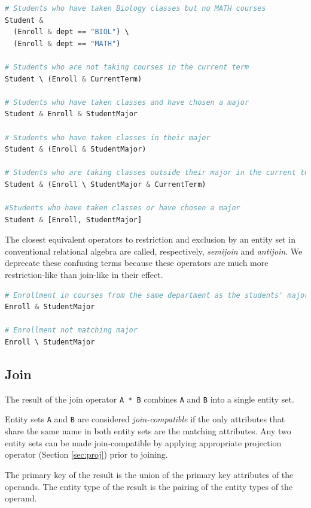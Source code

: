 \documentclass[letter,10pt]{article}
\begin{document}
\begin{lstlisting}[language=Python, caption={Composite restrictions.}, label={lst:res-comp}]
# Students who have taken Biology classes but no MATH courses
Student & 
  (Enroll & dept == "BIOL") \ 
  (Enroll & dept == "MATH")

# Students who are not taking courses in the current term
Student \ (Enroll & CurrentTerm)

# Students who have taken classes and have chosen a major
Student & Enroll & StudentMajor

# Students who have taken classes in their major
Student & (Enroll & StudentMajor)

# Students who are taking classes outside their major in the current term
Student & (Enroll \ StudentMajor & CurrentTerm)

#Students who have taken classes or have chosen a major
Student & [Enroll, StudentMajor]
\end{lstlisting}

The closest equivalent operators to restriction and exclusion by an entity set in conventional relational algebra are called, respectively, \emph{semijoin} and \emph{antijoin}.
We deprecate these confusing terms because these operators are much more restriction-like than join-like in their effect.

\begin{lstlisting}[language=Python, caption={Avoiding unintended restrictions.}, label={lst:res7}]
# Enrollment in courses from the same department as the students' major
Enroll & StudentMajor

# Enrollment not matching major 
Enroll \ StudentMajor 
\end{lstlisting}

\subsection{Join}\label{sec:join}
The result of the join operator \lstinline$A * B$ combines \lstinline$A$ and \lstinline$B$ into a single entity set.

Entity sets \lstinline$A$ and \lstinline$B$ are considered \emph{join-compatible} if the only attributes that share the same name in both entity sets are the matching attributes.
Any two entity sets can be made join-compatible by applying appropriate projection operator (Section \ref{sec:proj}) prior to joining.

The primary key of the result is the union of the primary key attributes of the operands. 
The entity type of the result is the pairing of the entity types of the operand.  
\end{document}
